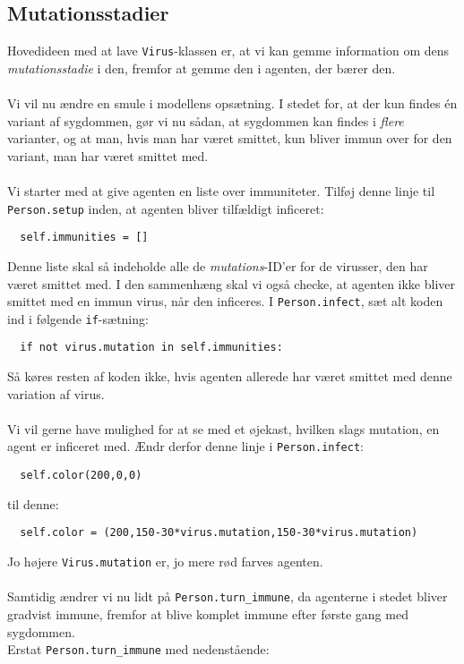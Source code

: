 \documentclass{article}
\begin{document}
\subsection{Mutationsstadier}
Hovedideen med at lave \texttt{Virus}-klassen er, at vi kan gemme information om dens \textit{mutationsstadie} i den, fremfor at gemme den i agenten, der bærer den.\\\\
Vi vil nu ændre en smule i modellens opsætning. I stedet for, at der kun findes én variant af sygdommen, gør vi nu sådan, at sygdommen kan findes i \textit{flere} varianter, og at man, hvis man har været smittet, kun bliver immun over for den variant, man har været smittet med.\\\\
Vi starter med at give agenten en liste over immuniteter. Tilføj denne linje til \texttt{Person.setup} inden, at agenten bliver tilfældigt inficeret:
\begin{lstlisting}
  self.immunities = []
\end{lstlisting}
Denne liste skal så indeholde alle de \textit{mutations}-ID'er for de virusser, den har været smittet med. I den sammenhæng skal vi også checke, at agenten ikke bliver smittet med en immun virus, når den inficeres. I \texttt{Person.infect}, sæt alt koden ind i følgende \texttt{if}-sætning:
\begin{lstlisting}
  if not virus.mutation in self.immunities:
\end{lstlisting}
Så køres resten af koden ikke, hvis agenten allerede har været smittet med denne variation af virus.\\\\
Vi vil gerne have mulighed for at se med et øjekast, hvilken slags mutation, en agent er inficeret med. Ændr derfor denne linje i \texttt{Person.infect}:
\begin{lstlisting}
  self.color(200,0,0)
\end{lstlisting}
til denne:
\begin{lstlisting}
  self.color = (200,150-30*virus.mutation,150-30*virus.mutation)
\end{lstlisting}
Jo højere \texttt{Virus.mutation} er, jo mere rød farves agenten.\\\\
Samtidig ændrer vi nu lidt på \texttt{Person.turn\_immune}, da agenterne i stedet bliver gradvist immune, fremfor at blive komplet immune efter første gang med sygdommen.\\
Erstat \texttt{Person.turn\_immune} med nedenstående:
\end{document}
